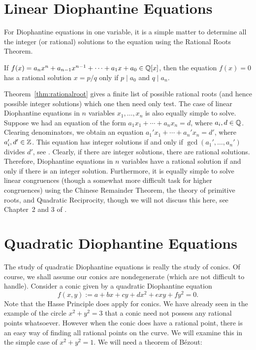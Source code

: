 \section{Linear Diophantine Equations \label{sec:linearequations}}

For Diophantine equations in one variable, it is a simple matter to determine all the integer (or rational) solutions to the equation using the Rational Roots Theorem.


\begin{thm} \label{thm:rationalroot}
If $f(x)= a_nx^n + a_{n-1}x^{n-1} + \cdots + a_1x + a_0 \in \mathbb{Q}[x]$, then the equation $f(x)= 0$ has a rational solution $x= p/q$ only if $p \mid a_0$ and $q \mid a_n$. 
\end{thm}


Theorem~\ref{thm:rationalroot} gives a finite list of possible rational roots (and hence possible integer solutions) which one then need only test. The case of linear Diophantine equations in $n$ variables $x_1, \ldots, x_n$ is also equally simple to solve. Suppose we had an equation of the form $a_1x_1 + \cdots + a_nx_n= d$, where $a_i, d \in \mathbb{Q}$. Clearing denominators, we obtain an equation $a_1'x_1 + \cdots + a_n'x_n= d'$, where $a_i', d' \in \mathbb{Z}$. This equation has integer solutions if and only if $\gcd(a_1',\ldots,a_n')$ divides $d'$, see \cite[Thm.~1.15]{nathanson00}. Clearly, if there are integer solutions, there are rational solutions. Therefore, Diophantine equations in $n$ variables have a rational solution if and only if there is  an integer solution. Furthermore, it is equally simple to solve linear congruences (though a somewhat more difficult task for higher congruences) using the Chinese Remainder Theorem, the theory of primitive roots, and Quadratic Reciprocity, though we will not discuss this here, see Chapter~2 and 3 of \cite{nathanson00}. 





\section{Quadratic Diophantine Equations\label{sec:quaddioeq}}

The study of quadratic Diophantine equations is really the study of conics. Of course, we shall assume our conics are nondegenerate (which are not difficult to handle). Consider a conic given by a quadratic Diophantine equation
	\[
	f(x,y):= a + bx + cy + dx^2 + exy + fy^2= 0.
	\]
Note that the Hasse Principle does apply for conics. We have already seen in the example of the circle $x^2 + y^2= 3$ that a conic need not possess any rational points whatsoever. However when the conic does have a rational point, there is an easy way of finding all rational points on the curve. We will examine this in the simple case of $x^2 + y^2= 1$. We will need a theorem of B\'ezout:

